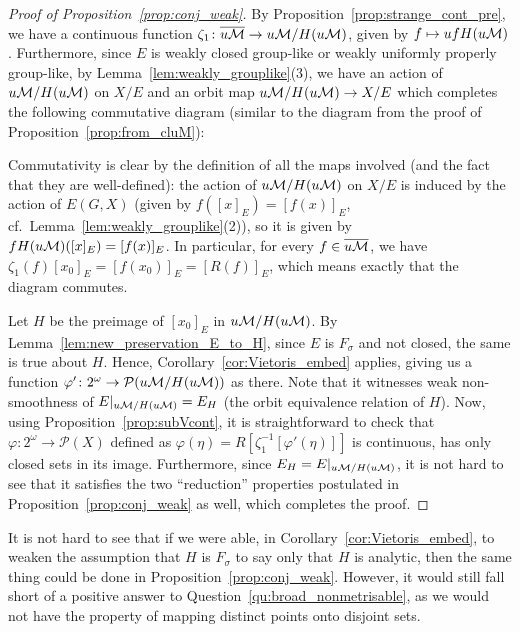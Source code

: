 	\begin{proof}[Proof of Proposition~\ref{prop:conj_weak}]
		By Proposition~\ref{prop:strange_cont_pre}, we have a continuous function $\zeta_1\colon \overline{u{\mathcal M}}\to u{\mathcal M}/H(u{\mathcal M})$, given by $f\mapsto ufH(u{\mathcal M})$. Furthermore, since $E$ is weakly closed group-like or weakly uniformly properly group-like, by Lemma~\ref{lem:weakly_grouplike}(3), we have an action of $u{\mathcal M}/H(u{\mathcal M})$ on $X/E$ and an orbit map $u{\mathcal M}/H(u{\mathcal M})\to X/E$ which completes the following commutative diagram (similar to the diagram from the proof of Proposition~\ref{prop:from_cluM}):
		\begin{center}
		\end{center}
		Commutativity is clear by the definition of all the maps involved (and the fact that they are well-defined): the action of $u{\mathcal M}/H(u{\mathcal M})$ on $X/E$ is induced by the action of $E(G,X)$ (given by $f([x]_E)=[f(x)]_E$, cf.\ Lemma~\ref{lem:weakly_grouplike}(2)), so it is given by $fH(u{\mathcal M})([x]_E)=[f(x)]_E$. In particular, for every $f\in \overline{u{\mathcal M}}$, we have $\zeta_1(f)[x_0]_E=[f(x_0)]_E=[R(f)]_E$, which means exactly that the diagram commutes.
		
		
		Let $H$ be the preimage of $[x_0]_E$ in $u{\mathcal M}/H(u{\mathcal M})$. By Lemma~\ref{lem:new_preservation_E_to_H}, since $E$ is $F_\sigma$ and not closed, the same is true about $H$. Hence, Corollary~\ref{cor:Vietoris_embed} applies, giving us a function $\varphi'\colon 2^\omega\to \mathcal P(u{\mathcal M}/H(u{\mathcal M}))$ as there. Note that it witnesses weak non-smoothness of $E|_{u{\mathcal M}/H(u{\mathcal M})}=E_H$ (the orbit equivalence relation of $H$). Now, using Proposition~\ref{prop:subVcont}, it is straightforward to check that $\varphi\colon 2^\omega\to \mathcal P(X)$ defined as $\varphi(\eta)=R[\zeta_1^{-1}[\varphi'(\eta)]]$ is continuous, has only closed sets in its image. Furthermore, since $E_H=E|_{u{\mathcal M}/H(u{\mathcal M})}$, it is not hard to see that it satisfies the two ``reduction'' properties postulated in Proposition~\ref{prop:conj_weak} as well, which completes the proof.
	\end{proof}
	
	\begin{rem}
		It is not hard to see that if we were able, in Corollary~\ref{cor:Vietoris_embed}, to weaken the assumption that $H$ is $F_\sigma$ to say only that $H$ is analytic, then the same thing could be done in Proposition~\ref{prop:conj_weak}. However, it would still fall short of a positive answer to Question~\ref{qu:broad_nonmetrisable}, as we would not have the property of mapping distinct points onto disjoint sets.\xqed{\lozenge}
	\end{rem}
	
